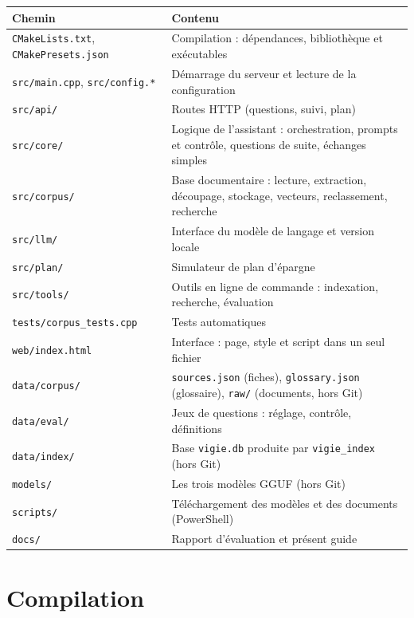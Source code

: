 \documentclass[11pt,a4paper]{article}
\newcommand{\fichier}[1]{\texttt{#1}}
\begin{document}
\begin{center}
\small
\begin{tabularx}{\linewidth}{@{}l X@{}}
\toprule
Chemin & Contenu \\
\midrule
\fichier{CMakeLists.txt}, \fichier{CMakePresets.json} & Compilation : dépendances, bibliothèque et exécutables \\
\fichier{src/main.cpp}, \fichier{src/config.*} & Démarrage du serveur et lecture de la configuration \\
\fichier{src/api/} & Routes HTTP (questions, suivi, plan) \\
\fichier{src/core/} & Logique de l'assistant : orchestration, prompts et contrôle, questions de suite, échanges simples \\
\fichier{src/corpus/} & Base documentaire : lecture, extraction, découpage, stockage, vecteurs, reclassement, recherche \\
\fichier{src/llm/} & Interface du modèle de langage et version locale \\
\fichier{src/plan/} & Simulateur de plan d'épargne \\
\fichier{src/tools/} & Outils en ligne de commande : indexation, recherche, évaluation \\
\fichier{tests/corpus\_tests.cpp} & Tests automatiques \\
\fichier{web/index.html} & Interface : page, style et script dans un seul fichier \\
\fichier{data/corpus/} & \fichier{sources.json} (fiches), \fichier{glossary.json} (glossaire), \fichier{raw/} (documents, hors Git) \\
\fichier{data/eval/} & Jeux de questions : réglage, contrôle, définitions \\
\fichier{data/index/} & Base \fichier{vigie.db} produite par \fichier{vigie\_index} (hors Git) \\
\fichier{models/} & Les trois modèles GGUF (hors Git) \\
\fichier{scripts/} & Téléchargement des modèles et des documents (PowerShell) \\
\fichier{docs/} & Rapport d'évaluation et présent guide \\
\bottomrule
\end{tabularx}
\end{center}

\section{Compilation}
\end{document}
